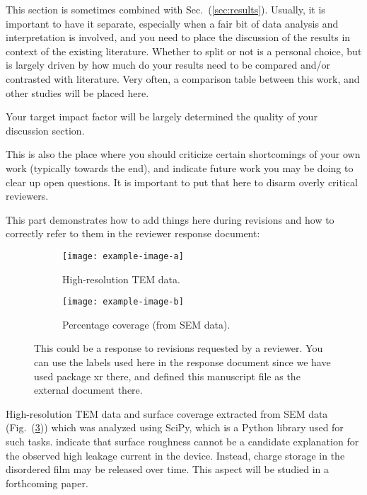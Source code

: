 \documentclass[12pt,twocolumn]{article}
\begin{document}
This section is sometimes combined with Sec.~(\ref{sec:results}). Usually, it is important to have it separate, especially when a fair bit of data analysis and interpretation is involved, and you need to place the discussion of the results in context of the existing literature. Whether to split or not is a personal choice, but is largely driven by how much do your results need to be compared and/or contrasted with literature. Very often, a comparison table between this work, and other studies will be placed here.

Your target impact factor will be largely determined the quality of your discussion section.

This is also the place where you should criticize certain shortcomings of your own work (typically towards the end), and indicate future work you may be doing to clear up open questions. It is important to put that here to disarm overly critical reviewers.

This part demonstrates how to add things here during revisions and how to correctly refer to them in the reviewer response document:

\begin{figure}
  \centering
  \begin{subfigure}{42mm}
    \centering
    \texttt{[image: example-image-a]}
    \caption{High-resolution TEM data.}
    \label{fig:hrtem}
  \end{subfigure}
  \hfill
  \begin{subfigure}{42mm}
    \centering
    \texttt{[image: example-image-b]}
    \caption{Percentage coverage (from SEM data).}
    \label{fig:surfacecoverage}
  \end{subfigure}
  \caption{ This could be a response to revisions requested by a reviewer.   You can use the labels used here in the response document since we have used package xr there, and defined this manuscript file as the external document there.}
  \label{fig:revisedtem}
\end{figure}

High-resolution TEM data and surface coverage extracted from SEM data (Fig.~(\ref{fig:revisedtem})) which was analyzed using SciPy\cite{virtanen:2020}, which is a Python\cite{perez:2011,stancin:2019} library used for such tasks. indicate that surface roughness cannot be a candidate explanation for the observed high leakage current in the device. Instead, charge storage in the disordered film may be released over time. This aspect will be studied in a forthcoming paper\label{page:rev1q2}.
\end{document}

